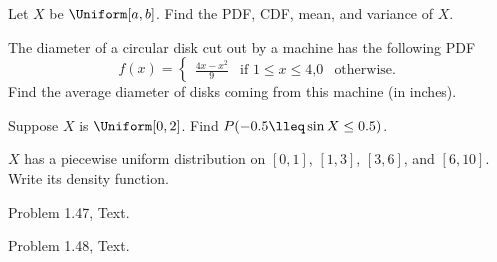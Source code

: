\begin{problem}[Handout 12, \# 2]
  Let \(X\) be \(\Uniform[a,b]\). Find the PDF, CDF, mean, and variance of
  \(X\).
\end{problem}
\begin{solution}

\end{solution}
\newpage

\begin{problem}[Handout 12, \# 8]
  The diameter of a circular disk cut out by a machine has the following
  PDF
  \[f(x)=\begin{cases}
      \frac{4x-x^2}{9}&\text{if \(1\leq x\leq 4\),}
      0&\text{otherwise.}
    \end{cases}
  \]
  Find the average diameter of disks coming from this machine (in inches).
\end{problem}
\begin{solution}

\end{solution}
\newpage

\begin{problem}[Handout 12, \# 9]
  Suppose \(X\) is \(\Uniform[0,2]\). Find \(P(-0.5\lleq \sin X\leq
  0.5)\).
\end{problem}
\begin{solution}

\end{solution}
\newpage

\begin{problem}[Handout 12, \# 13]
  \(X\) has a piecewise uniform distribution on \([0,1]\), \([1,3]\),
  \([3,6]\), and \([6,10]\). Write its density function.
\end{problem}
\begin{solution}

\end{solution}
\newpage

\begin{problem}[Handout 12, \# 16]
  Problem 1.47, Text.
\end{problem}
\begin{solution}

\end{solution}
\newpage

\begin{problem}[Handout 12, \# 17]
  Problem 1.48, Text.
\end{problem}
\begin{solution}

\end{solution}
\newpage

